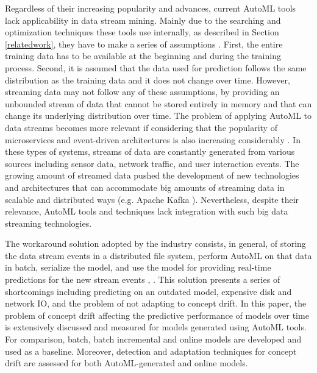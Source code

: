 \documentclass{sig-alternate-br}
\begin{document}
Regardless of their increasing popularity and advances, current AutoML tools lack applicability in data stream mining. Mainly due to the searching and optimization techniques these tools use internally, as described in Section \ref{relatedwork}, they have to make a series of assumptions \cite{madrid2019towards}. First, the entire training data has to be available at the beginning and during the training process. Second, it is assumed that the data used for prediction follows the same distribution as the training data and it does not change over time. However, streaming data may not follow any of these assumptions, by providing an unbounded stream of data that cannot be stored entirely in memory and that can change its underlying distribution over time. The problem of applying AutoML to data streams becomes more relevant if considering that the popularity of microservices and event-driven architectures is also increasing considerably \cite{richards2015microservices}. In these types of systems, streams of data are constantly generated from various sources including sensor data, network traffic, and user interaction events. The growing amount of streamed data pushed the development of new technologies and architectures that can accommodate big amounts of streaming data in scalable and distributed ways (e.g. Apache Kafka \cite{kreps2011kafka}). Nevertheless, despite their relevance, AutoML tools and techniques lack integration with such big data streaming technologies.

The workaround solution adopted by the industry consists, in general, of storing the data stream events in a distributed file system, perform AutoML on that data in batch, serialize the model, and use the model for providing real-time predictions for the new stream events \cite{uber2017michelangelo}, \cite{gctables}. This solution presents a series of shortcomings including predicting on an outdated model, expensive disk and network IO, and the problem of not adapting to concept drift. In this paper, the problem of concept drift affecting the predictive performance of models over time is extensively discussed and measured for models generated using AutoML tools. For comparison, batch, batch incremental and online models are developed and used as a baseline. Moreover, detection and adaptation techniques for concept drift are assessed for both AutoML-generated and online models. 
\end{document}
